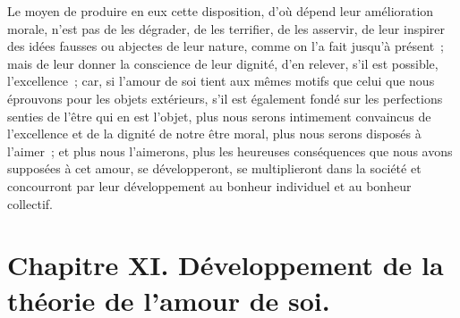 \documentclass[french,twoside]{book} %
\newcommand\chapteropen{} %
\newcommand\chapterclose{} %
\begin{document}
Le moyen de produire en eux cette disposition, d’où dépend leur amélioration morale, n’est pas de les dégrader, de les terrifier, de les asservir, de leur inspirer des idées fausses ou abjectes de leur nature, comme on l’a fait jusqu’à présent ; mais de leur donner la conscience de leur dignité, d’en relever, s’il est possible, l’excellence ; car, si l’amour de soi tient aux mêmes motifs que celui que nous éprouvons pour les objets extérieurs, s’il est également fondé sur les perfections senties de l’être qui en est l’objet, plus nous serons intimement convaincus de l’excellence et de la dignité de notre être moral, plus nous serons disposés à l’aimer ; et plus nous l’aimerons, plus les heureuses conséquences que nous avons supposées à cet amour, se développeront, se multiplieront dans la société et concourront par leur développement au bonheur individuel et au bonheur collectif.
\chapterclose


\chapteropen
\chapter[{Chapitre XI. Développement de la théorie de l’amour de soi.}]{Chapitre XI. Développement de la théorie de l’amour de soi.}\renewcommand{\leftmark}{Chapitre XI. Développement de la théorie de l’amour de soi.}
\end{document}
